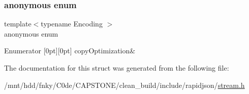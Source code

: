 \subsubsection{\texorpdfstring{anonymous enum}{anonymous enum}}
{\footnotesize\ttfamily template$<$typename Encoding $>$ \\
anonymous enum}

\begin{DoxyEnumFields}{Enumerator}
[0pt][0pt]{}\mbox{\label{structStreamTraits_3_01GenericInsituStringStream_3_01Encoding_01_4_01_4_aba5f0bc6f5bfad575279776a2cd8dc7ba8d0f051fca7788dc2aeaadd6e5a153ed}} 
copy\+Optimization&\\
\hline

\end{DoxyEnumFields}


The documentation for this struct was generated from the following file\+:\begin{DoxyCompactItemize}
\item 
/mnt/hdd/fnky/\+C0de/\+C\+A\+P\+S\+T\+O\+N\+E/clean\+\_\+build/include/rapidjson/\hyperlink{stream_8h}{stream.\+h}\end{DoxyCompactItemize}
